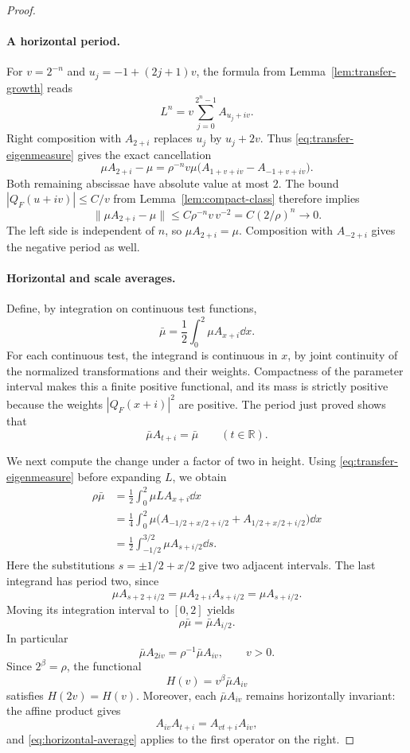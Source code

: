 \begin{proof}
\paragraph{A horizontal period.}
For $v=2^{-n}$ and $u_j=-1+(2j+1)v$, the formula from
Lemma~\ref{lem:transfer-growth} reads
\[
 L^n=v\sum_{j=0}^{2^n-1}A_{u_j+iv}.
\]
Right composition with $A_{2+i}$ replaces $u_j$ by $u_j+2v$.
Thus \eqref{eq:transfer-eigenmeasure} gives the exact cancellation
\begin{equation}
 \mu A_{2+i}-\mu
 =\rho^{-n}v\mu
    \bigl(A_{1+v+iv}-A_{-1+v+iv}\bigr).
 \label{eq:horizontal-endpoints}
\end{equation}
Both remaining abscissae have absolute value at most $2$.  The bound
$|Q_F(u+iv)|\leq C/v$ from Lemma~\ref{lem:compact-class} therefore implies
\[
 \|\mu A_{2+i}-\mu\|
 \leq C\rho^{-n}v\,v^{-2}
 =C(2/\rho)^n\longrightarrow0.
\]
The left side is independent of $n$, so $\mu A_{2+i}=\mu$.
Composition with $A_{-2+i}$ gives the negative period as well.

\paragraph{Horizontal and scale averages.}
Define, by integration on continuous test functions,
\[
 \bar\mu=\frac12\int_0^2\mu A_{x+i}\dd x.
\]
For each continuous test, the integrand is continuous in $x$, by joint
continuity of the normalized transformations and their weights.  Compactness
of the parameter interval makes this a finite positive functional, and its
mass is strictly positive because the weights $|Q_F(x+i)|^2$ are positive.
The period just proved shows that
\begin{equation}
 \bar\mu A_{t+i}=\bar\mu\qquad(t\in\mathbb R).
 \label{eq:horizontal-average}
\end{equation}

We next compute the change under a factor of two in height.  Using
\eqref{eq:transfer-eigenmeasure} before expanding $L$, we obtain
\begin{align*}
 \rho\bar\mu
 &=\frac12\int_0^2\mu L A_{x+i}\dd x\\
 &=\frac14\int_0^2
      \mu\bigl(A_{-1/2+x/2+i/2}+A_{1/2+x/2+i/2}\bigr)\dd x\\
 &=\frac12\int_{-1/2}^{3/2}\mu A_{s+i/2}\dd s.
\end{align*}
Here the substitutions $s=\pm1/2+x/2$ give two adjacent intervals.
The last integrand has period two, since
\[
 \mu A_{s+2+i/2}=\mu A_{2+i}A_{s+i/2}
                =\mu A_{s+i/2}.
\]
Moving its integration interval to $[0,2]$ yields
\begin{equation}
 \rho\bar\mu=\bar\mu A_{i/2}.
 \label{eq:half-scale-average}
\end{equation}
In particular
\[
 \bar\mu A_{2iv}=\rho^{-1}\bar\mu A_{iv},
 \qquad v>0.
\]
Since $2^\beta=\rho$, the functional
\[
 H(v)=v^\beta\bar\mu A_{iv}
\]
satisfies $H(2v)=H(v)$.  Moreover, each $\bar\mu A_{iv}$ remains
horizontally invariant: the affine product gives
\[
 A_{iv}A_{t+i}=A_{vt+i}A_{iv},
\]
and \eqref{eq:horizontal-average} applies to the first operator on the
right.


\end{proof}
